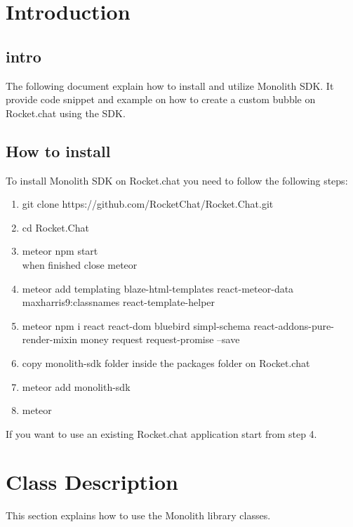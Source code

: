 \section{Introduction}
\subsection{intro}
The following document explain how to install and utilize Monolith SDK.
It provide code snippet and example on how to create a custom bubble on Rocket.chat using the SDK.

\subsection{How to install}
To install Monolith SDK on Rocket.chat you need to follow the following steps:
\begin{enumerate}
    \item git clone https://github.com/RocketChat/Rocket.Chat.git
    \item cd Rocket.Chat
    \item meteor npm start \\ when finished close meteor
    \item meteor add templating blaze-html-templates react-meteor-data maxharris9:classnames react-template-helper
    \item meteor npm i react react-dom bluebird simpl-schema react-addons-pure-render-mixin money request request-promise  --save
    \item copy monolith-sdk folder inside the packages folder on Rocket.chat
    \item meteor add monolith-sdk
    \item meteor
\end{enumerate}

\begin{flushleft}
If you want to use an existing Rocket.chat application start from step 4.
\end{flushleft}

\section{Class Description}
This section explains how to use the Monolith library classes.


